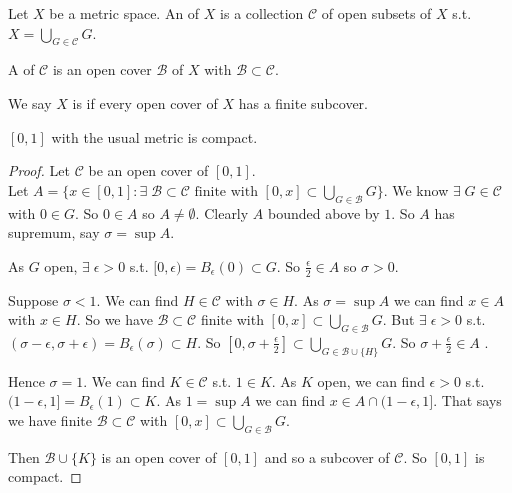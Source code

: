 \begin{definition}
    Let $X$ be a metric space.
    An  of $X$ is a collection $\mathcal{C}$ of open subsets of $X$ s.t. $X = \bigcup_{G \in \mathcal{C}} G$.
\end{definition} 

\begin{definition}[Subcover]
    A  of $\mathcal{C}$ is an open cover $\mathcal{B}$ of $X$ with $\mathcal{B} \subset \mathcal{C}$.
\end{definition} 

\begin{definition}[Compact]
    We say $X$ is  if every open cover of $X$ has a finite subcover.
\end{definition} 

\begin{example}
    $[0, 1]$ with the usual metric is compact.
\end{example} 

\begin{proof}
    Let $\mathcal{C}$ be an open cover of $[0, 1]$. \\
    Let $A = \{ x \in [0, 1] : \exists \; \mathcal{B} \subset \mathcal{C} \text{ finite with } [0, x] \subset \bigcup_{G \in \mathcal{B}} G \}$.
    We know $\exists \; G \in \mathcal{C}$ with $0 \in G$.
    So $0 \in A$ so $A \neq \emptyset$.
    Clearly $A$ bounded above by $1$.
    So $A$ has supremum, say $\sigma = \sup A$.

    As $G$ open, $\exists \; \epsilon > 0$ s.t. $[0, \epsilon) = B_\epsilon(0) \subset G$.
    So $\frac{\epsilon}{2} \in A$ so $\sigma > 0$.

    Suppose $\sigma < 1$.
    We can find $H \in \mathcal{C}$ with $\sigma \in H$.
    As $\sigma = \sup A$ we can find $x \in A$ with $x \in H$.
    So we have $\mathcal{B} \subset \mathcal{C}$ finite with $[0, x] \subset \bigcup_{G \in \mathcal{B}} G$.
    But $\exists \; \epsilon > 0$ s.t. $(\sigma - \epsilon, \sigma + \epsilon) = B_\epsilon(\sigma) \subset H$.
    So $[0, \sigma + \frac{\epsilon}{2}] \subset \bigcup_{G \in \mathcal{B} \cup \{H\}} G$.
    So $\sigma + \frac{\epsilon}{2} \in A$ \Lightning.

    Hence $\sigma = 1$.
    We can find $K \in \mathcal{C}$ s.t. $1 \in K$.
    As $K$ open, we can find $\epsilon > 0$ s.t. $(1 - \epsilon, 1] = B_\epsilon(1) \subset K$.
    As $1 = \sup A$ we can find $x \in A \cap (1 - \epsilon, 1]$.
    That says we have finite $\mathcal{B} \subset \mathcal{C}$ with $[0, x] \subset \bigcup_{G \in \mathcal{B}} G$.

    Then $\mathcal{B} \cup \{K\}$ is an open cover of $[0, 1]$ and so a subcover of $\mathcal{C}$.
    So $[0, 1]$ is compact.
\end{proof} 

